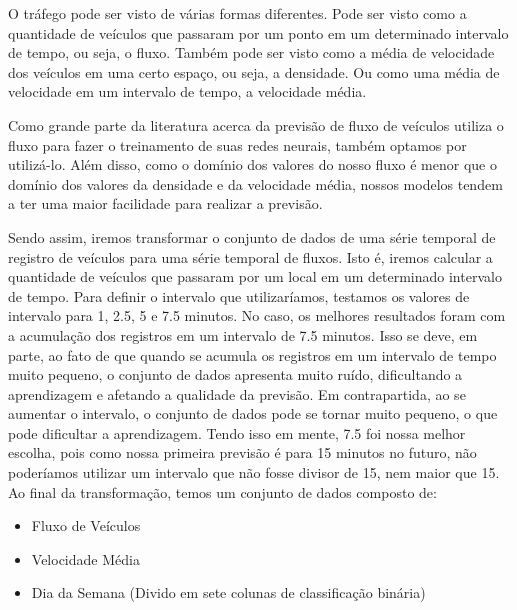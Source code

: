 O tráfego pode ser visto de várias formas diferentes. Pode ser visto como a quantidade de veículos que passaram por um ponto em um determinado intervalo de tempo, ou seja, o fluxo. Também pode ser visto como a média de velocidade dos veículos em uma certo espaço, ou seja, a densidade. Ou como uma média de velocidade em um intervalo de tempo, a velocidade média.

Como grande parte da literatura acerca da previsão de fluxo de veículos utiliza o fluxo para fazer o treinamento de suas redes neurais, também optamos por utilizá-lo. Além disso, como o domínio dos valores do nosso fluxo é menor que o domínio dos valores da densidade e da velocidade média, nossos modelos tendem a ter uma maior facilidade para realizar a previsão.

Sendo assim, iremos transformar o conjunto de dados de uma série temporal de registro de veículos para uma série temporal de fluxos. Isto é, iremos calcular a quantidade de veículos que passaram por um local em um determinado intervalo de tempo. Para definir o intervalo que utilizaríamos, testamos os valores de intervalo para 1, 2.5, 5 e 7.5 minutos. No caso, os melhores resultados foram com a acumulação dos registros em um intervalo de 7.5 minutos. Isso se deve, em parte, ao fato de que quando se acumula os registros em um intervalo de tempo muito pequeno, o conjunto de dados apresenta muito ruído, dificultando a aprendizagem e afetando a qualidade da previsão. Em contrapartida, ao se aumentar o intervalo, o conjunto de dados pode se tornar muito pequeno, o que pode dificultar a aprendizagem. Tendo isso em mente, 7.5 foi nossa melhor escolha, pois como nossa primeira previsão é para 15 minutos no futuro, não poderíamos utilizar um intervalo que não fosse divisor de 15, nem maior que 15. Ao final da transformação, temos um conjunto de dados composto de:

\begin{itemize}
    \item Fluxo de Veículos
    \item Velocidade Média
    \item Dia da Semana (Divido em sete colunas de classificação binária)
\end{itemize}

